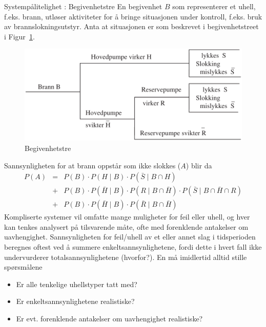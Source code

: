 \begin{eksempel}{Systempålitelighet : Begivenhetstre}
En begivenhet $B$ som representerer et uhell, f.eks. brann, utløser
aktiviteter for å bringe situasjonen under kontroll, f.eks. bruk av
brannslokningsutstyr. Anta at situasjonen er som beskrevet i
begivenhetstreet i Figur~\ref{fig:begivenhetstre}. 

\begin{figure}[ht]
\centering \centering
\includegraphics[scale=0.7]{figurer/fig4_6.pdf} 
\caption{Begivenhetstre}
	\label{fig:begivenhetstre}
\end{figure}

Sannsynligheten for at brann oppstår som ikke slokkes ($A$) blir da
\begin{eqnarray*}
P(A)&=&P(B) \cdot P(H \mid B) \cdot P(\bar{S} \mid B \cap H) \\
    &+&P(B) \cdot P(\bar{H} \mid B) \cdot P(R \mid B \cap \bar{H})
                 \cdot  P(\bar{S} \mid B \cap \bar{H} \cap R) \\
    &+&P(B) \cdot P(\bar{H} \mid B) \cdot P(\bar{R} \mid B \cap \bar{H})
\end{eqnarray*}
Kompliserte systemer vil omfatte mange muligheter for feil eller uhell,
og hver kan tenkes analysert på tilsvarende måte, ofte med
forenklende antakelser om uavhengighet. Sannsynligheten for feil/uhell
av et eller annet slag i tidsperioden beregnes oftest ved å summere
enkeltsannsynlighetene, fordi dette i hvert fall ikke undervurderer
totalsannsynlighetene (hvorfor?). En må imidlertid alltid stille
spørsmålene
\end{eksempel}
\begin{itemize}
\item Er alle tenkelige uhellstyper tatt med?
\item Er enkeltsannsynlighetene realistiske?
\item Er evt. forenklende antakelser om uavhengighet realistiske? 
\end{itemize}
\mbox{} \\

